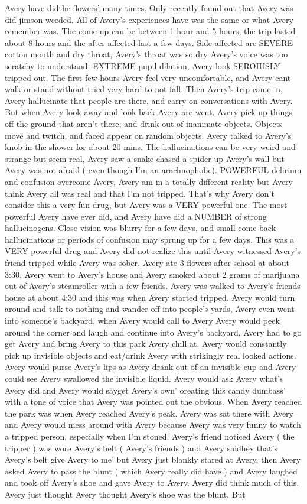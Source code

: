 \documentclass[12pt]{book}
\begin{document}
Avery have didthe flowers' many times. Only recently found out that Avery was did jimson weeded. All of Avery's experiences have was the same or what Avery remember was. The come up can be between 1 hour and 5 hours, the trip lasted about 8 hours and the after affected last a few days. Side affected are SEVERE cotton mouth and dry throat, Avery's throat was so dry Avery's voice was too scratchy to understand. EXTREME pupil dilation, Avery look SEROIUSLY tripped out. The first few hours Avery feel very uncomfortable, and Avery cant walk or stand without tried very hard to not fall. Then Avery's trip came in, Avery hallucinate that people are there, and carry on conversations with Avery. But when Avery look away and look back Avery are went. Avery pick up things off the ground that aren't there, and drink out of inanimate objects. Objects move and twitch, and faced appear on random objects. Avery talked to Avery's knob in the shower for about 20 mins. The hallucinations can be very weird and strange but seem real, Avery saw a snake chased a spider up Avery's wall but Avery was not afraid ( even though I'm an arachnophobe). POWERFUL delirium and confusion overcome Avery, Avery am in a totally different reality but Avery think Avery all was real and that I'm not tripped. That's why Avery don't consider this a very fun drug, but Avery was a VERY powerful one. The most powerful Avery have ever did, and Avery have did a NUMBER of strong hallucinogens. Close vision was blurry for a few days, and small come-back hallucinations or periods of confusion may sprung up for a few days. This was a VERY powerful drug and Avery did not realize this until Avery witnessed Avery's friend tripped while Avery was sober. Avery ate 3 flowers after school at about 3:30, Avery went to Avery's house and Avery smoked about 2 grams of marijuana out of Avery's steamroller with a few friends. Avery was walked to Avery's friends house at about 4:30 and this was when Avery started tripped. Avery would turn around and talk to nothing and wander off into people's yards, Avery even went into someone's backyard, when Avery would call to Avery Avery would peek around the corner and laugh and continue into Avery's backyard, Avery had to go get Avery and bring Avery to this park Avery chill at. Avery would constantly pick up invisible objects and eat/drink Avery with strikingly real looked actions. Avery would purse Avery's lips as Avery drank out of an invisible cup and Avery could see Avery swallowed the invisible liquid. Avery would ask Avery what's Avery did and Avery would sayget Avery's own' oreating this candy dumbass' with a tone of voice that Avery was pointed out the obvious. When Avery reached the park was when Avery reached Avery's peak. Avery was sat there with Avery and Avery would mess around with Avery because Avery was very funny to watch a tripped person, especially when I'm stoned. Avery's friend noticed Avery ( the tripper ) was wore Avery's belt ( Avery's friends ) and Avery saidhey that's Avery's belt give Avery to me' but Avery just blankly stared at Avery, then Avery asked Avery to pass the blunt ( which Avery really did have ) and Avery laughed and took off Avery's shoe and gave Avery to Avery. Avery did think much of this, Avery just thought Avery thought Avery's shoe was the blunt. But 
\end{document}
